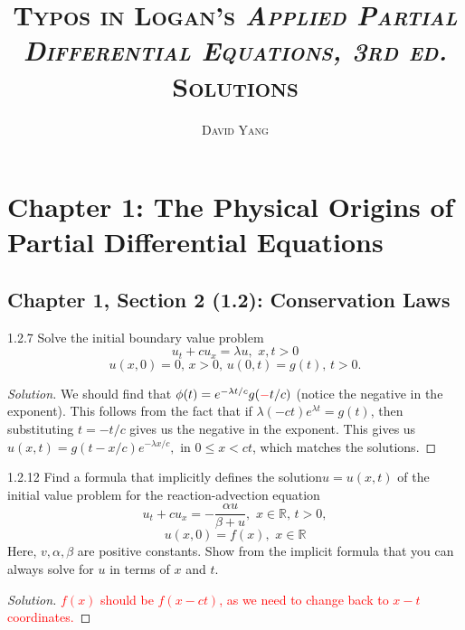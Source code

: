 \documentclass[11pt]{article}
\newenvironment{solution}
  {\renewcommand\qedsymbol{$\blacksquare$}\begin{proof}[Solution]}
  {\end{proof}}
\theoremstyle{definition}
\begin{document}
\title{\large	{\textsc{Typos in Logan's \textit{Applied Partial Differential Equations, 3rd ed.} Solutions}}}
\author{\textsc{David Yang}}
\date{}
\maketitle

\setcounter{tocdepth}{2}

\tableofcontents
\newpage
\vspace{1em}

\section{Chapter 1: The Physical Origins of Partial Differential Equations}
\setcounter{subsection}{1}
\subsection{Chapter 1, Section 2 (1.2): Conservation Laws}
\begin{exercise}{1.2.7} Solve the initial boundary value problem \[u_t+cu_x = \lambda u, \, \, x, t > 0 \]
\[u(x,0)=0, \, x>0, \, u(0,t)=g(t), \, t > 0.\]
\end{exercise}

\begin{solution}
We should find that $\phi(t) = e^{-\lambda t/c} g(\textcolor{red}{-}t/c)$ (notice the negative in the exponent). This follows from the fact that if $\lambda(-ct)e^{\lambda t} = g(t)$, then substituting $t = -t/c$ gives us the negative in the exponent.
This gives us $u(x, t) = g(t-x/c)e^{-\lambda x/c},$ in $0 \leq x < ct$, which matches the solutions.
\end{solution}

\begin{exercise}{1.2.12} Find a formula that implicitly defines the solution$ u = u(x, t)$ of the initial value problem for the reaction-advection equation
\[ u_t + cu_x = -\frac{\alpha u}{\beta + u}, \, \, x \in \mathbb{R}, \, t > 0, \] 
\[ u(x,0) = f(x), \, \, x \in \mathbb{R} \]
  Here, $v, \alpha, \beta$ are positive constants. Show from the implicit formula that you can always solve for $u$ in terms of $x$ and $t$.
  \end{exercise}
  
  \begin{solution}
  \textcolor{red}{$f(x)$ should be $f(x-ct)$, as we need to change back to $x-t$ coordinates.}
  \end{solution}
\end{document}

